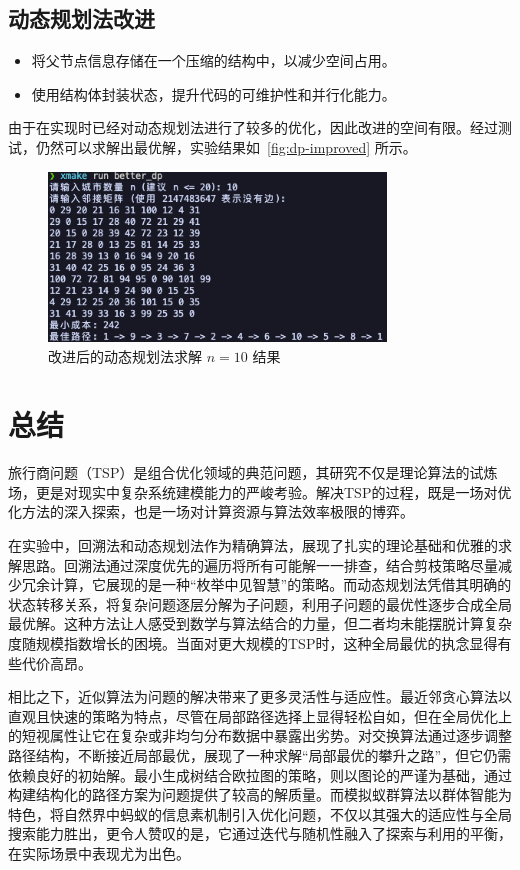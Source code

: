 \subsection{动态规划法改进}
\begin{itemize}
    \item 将父节点信息存储在一个压缩的结构中，以减少空间占用。
    \item 使用结构体封装状态，提升代码的可维护性和并行化能力。
\end{itemize}

由于在实现时已经对动态规划法进行了较多的优化，因此改进的空间有限。经过测试，仍然可以求解出最优解，实验结果如~\autoref{fig:dp-improved} 所示。
\begin{figure}[htbp]
    \centering
    \includegraphics[width=0.8\textwidth]{images/dp_improved.png}
    \caption{改进后的动态规划法求解 $n=10$ 结果}
    \label{fig:dp-improved}
\end{figure}

\section{总结}

旅行商问题（TSP）是组合优化领域的典范问题，其研究不仅是理论算法的试炼场，更是对现实中复杂系统建模能力的严峻考验。解决TSP的过程，既是一场对优化方法的深入探索，也是一场对计算资源与算法效率极限的博弈。

在实验中，回溯法和动态规划法作为精确算法，展现了扎实的理论基础和优雅的求解思路。回溯法通过深度优先的遍历将所有可能解一一排查，结合剪枝策略尽量减少冗余计算，它展现的是一种``枚举中见智慧''的策略。而动态规划法凭借其明确的状态转移关系，将复杂问题逐层分解为子问题，利用子问题的最优性逐步合成全局最优解。这种方法让人感受到数学与算法结合的力量，但二者均未能摆脱计算复杂度随规模指数增长的困境。当面对更大规模的TSP时，这种全局最优的执念显得有些代价高昂。

相比之下，近似算法为问题的解决带来了更多灵活性与适应性。最近邻贪心算法以直观且快速的策略为特点，尽管在局部路径选择上显得轻松自如，但在全局优化上的短视属性让它在复杂或非均匀分布数据中暴露出劣势。对交换算法通过逐步调整路径结构，不断接近局部最优，展现了一种求解``局部最优的攀升之路''，但它仍需依赖良好的初始解。最小生成树结合欧拉图的策略，则以图论的严谨为基础，通过构建结构化的路径方案为问题提供了较高的解质量。而模拟蚁群算法以群体智能为特色，将自然界中蚂蚁的信息素机制引入优化问题，不仅以其强大的适应性与全局搜索能力胜出，更令人赞叹的是，它通过迭代与随机性融入了探索与利用的平衡，在实际场景中表现尤为出色。

